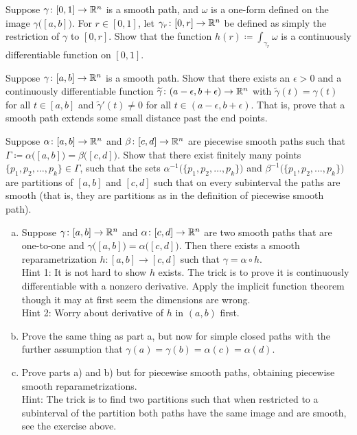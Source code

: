 \begin{exercise}
Suppose $\gamma \colon [0,1] \to {\mathbb{R}}^n$ is a smooth path, and
$\omega$ is a one-form defined on the image $\gamma\bigl([a,b]\bigr)$.
For $r \in [0,1]$, let $\gamma_r \colon [0,r] \to {\mathbb{R}}^n$ be defined
as simply the restriction of $\gamma$ to $[0,r]$.  Show that the
function $h(r) \coloneqq \int_{\gamma_r} \omega$ is a continuously
differentiable function on $[0,1]$.
\end{exercise}

\begin{exercise}
Suppose $\gamma \colon [a,b] \to {\mathbb{R}}^n$ is a smooth path.
Show that there exists an $\epsilon > 0$ and a continuously differentiable function
$\widetilde{\gamma} \colon (a-\epsilon,b+\epsilon) \to {\mathbb{R}}^n$
with $\widetilde{\gamma}(t) = \gamma(t)$ for all $t \in [a,b]$
and $\widetilde{\gamma}'(t) \neq 0$ for all $t \in 
(a-\epsilon,b+\epsilon)$.  That is, prove that a smooth path extends
some small distance past the end points.
\end{exercise}

\begin{exercise} 
Suppose $\alpha \colon [a,b] \to {\mathbb{R}}^n$ and
$\beta \colon [c,d] \to {\mathbb{R}}^n$ are piecewise smooth paths such that
$\Gamma \coloneqq \alpha\bigl([a,b]\bigr) = \beta\bigl([c,d]\bigr)$.
Show that there exist finitely many points
$\{ p_1,p_2,\ldots,p_k\} \in \Gamma$, such that
the sets
$\alpha^{-1}\bigl( \{ p_1,p_2,\ldots,p_k\} \bigr)$
and
$\beta^{-1}\bigl( \{ p_1,p_2,\ldots,p_k\} \bigr)$
are partitions of $[a,b]$ and $[c,d]$ such that on every subinterval
the paths are smooth (that is, they are partitions as in the definition
of piecewise smooth path).
\end{exercise}

\begin{exercise}
\pagebreak[3]
\leavevmode
\begin{enumerate}[a)]
\item
Suppose $\gamma \colon [a,b] \to {\mathbb{R}}^n$ and $\alpha \colon [c,d] \to {\mathbb{R}}^n$
are two smooth paths that are one-to-one and
$\gamma\bigl([a,b]\bigr) = \alpha\bigl([c,d]\bigr)$.  Then
there exists a smooth reparametrization $h \colon [a,b] \to [c,d]$
such that $\gamma = \alpha \circ h$.\\
Hint 1: It is not hard to show $h$ exists.
The trick is to prove it is continuously differentiable
with a nonzero derivative.  Apply the implicit function
theorem though it may at first seem the dimensions are wrong.\\
Hint 2: Worry about derivative of $h$ in $(a,b)$ first.
\item
Prove the same thing as part a, but now for simple closed paths with the
further assumption that $\gamma(a) = \gamma(b) = \alpha(c) = \alpha(d)$.
\item
Prove parts a) and b) but for piecewise smooth paths, obtaining
piecewise smooth reparametrizations.\\
Hint: The trick is to find two
partitions such that when restricted to a subinterval of the partition
both paths have the same image and are smooth, see the exercise above.
\end{enumerate}
\end{exercise}

